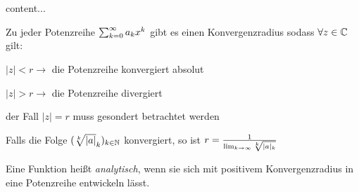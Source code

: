 
\begin{satz}
	content...
\end{satz}

\begin{satz}
	Zu jeder Potenzreihe $\sum_{k = 0}^{\infty} a_{k}x^k$ gibt es einen Konvergenzradius sodass $\forall z \in \mathbb{C}$ gilt:
	\begin{description}[noitemsep]
		\item $|z| < r \rightarrow $ die Potenzreihe konvergiert absolut
		\item $|z| > r \rightarrow $ die Potenzreihe divergiert
		\item der Fall $|z| = r$ muss gesondert betrachtet werden
	\end{description}
	Falls die Folge $(\sqrt[k]{|a|}_{k})_{k \in \mathbb{N}}$ konvergiert, so ist $r = \frac{1}{\lim_{k \rightarrow \infty}\sqrt[k]{|a|_k}}$
\end{satz}

\begin{definition}
	Eine Funktion heißt \emph{analytisch}, wenn sie sich mit positivem Konvergenzradius in eine Potenzreihe entwickeln lässt.
\end{definition}

